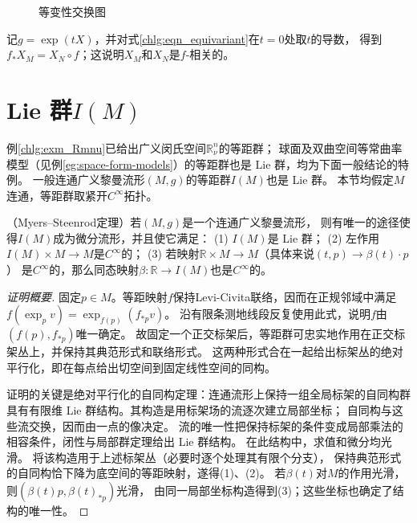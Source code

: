 \begin{figure}[htb]
    \centering
    \caption{等变性交换图}\label{chlg:pic_eqv-exchange}
\end{figure}

记$g=\exp(t X)$，并对式\eqref{chlg:eqn_equivariant}在$t=0$处取$t$的导数，
得到$f_* X_M = X_N \circ f$；这说明$X_M$和$X_N$是$f$-相关的。

\section{Lie 群\texorpdfstring{$I(M)$}{I(M)}}

例\ref{chlg:exm_Rmnu}已给出广义闵氏空间$\mathbb{R}^n_\nu$的等距群；
球面及双曲空间等常曲率模型（见例\ref{eg:space-form-models}）的等距群也是 Lie 群，均为下面一般结论的特例。
一般连通广义黎曼流形$(M,g)$的等距群$I(M)$也是 Lie 群。
本节均假定$M$连通，等距群取紧开$C^\infty$拓扑。

\begin{theorem}\label{chlg:thm_ISOM}
    （Myers--Steenrod定理）若$(M,g)$是一个连通广义黎曼流形，
    则有唯一的途径使得$I(M)$成为微分流形，并且使它满足：
    (1) $I(M)$是 Lie 群；
    (2) 左作用$I(M)\times M\to M$是$C^\infty$的；
    (3) 若映射$\mathbb{R}\times M\to M$（具体来说$(t,p)\to \beta(t)\cdot p$）
    是$C^\infty$的，那么同态映射$\beta : \mathbb{R}\to I(M)$也是$C^\infty$的。
\end{theorem}
\begin{proof}[证明概要]
固定$p\in M$。等距映射$f$保持Levi-Civita联络，因而在正规邻域中满足
$f(\exp_pv)=\exp_{f(p)}(f_{*p}v)$。
沿有限条测地线段反复使用此式，说明$f$由$(f(p),f_{*p})$唯一确定。
故固定一个正交标架后，等距群可忠实地作用在正交标架丛上，并保持其典范形式和联络形式。
这两种形式合在一起给出标架丛的绝对平行化，即在每点给出切空间到固定线性空间的同构。

证明的关键是绝对平行化的自同构定理：连通流形上保持一组全局标架的自同构群
具有有限维 Lie 群结构。其构造是用标架场的流逐次建立局部坐标；
自同构与这些流交换，因而由一点的像决定。
流的唯一性把保持标架的条件变成局部乘法的相容条件，闭性与局部群定理给出 Lie 群结构。
在此结构中，求值和微分均光滑。
将该构造用于上述标架丛（必要时逐个处理其有限个分支），
保持典范形式的自同构恰下降为底空间的等距映射，遂得(1)、(2)。
若$\beta(t)$对$M$的作用光滑，则$(\beta(t)p,\beta(t)_{*p})$光滑，
由同一局部坐标构造得到(3)；这些坐标也确定了结构的唯一性。
\end{proof}

